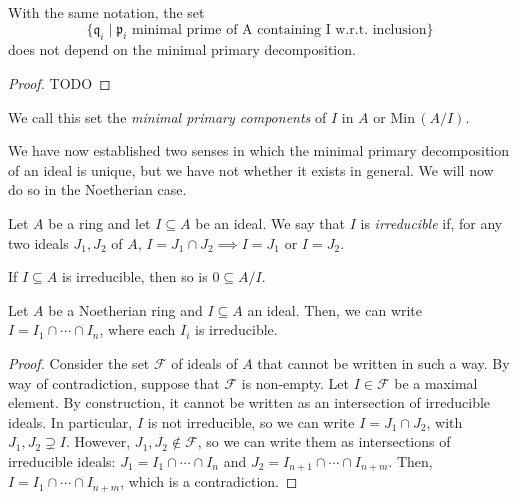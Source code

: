 \begin{theorem}
    With the same notation, the set \[\{\mathfrak{q}_i \mid \mathfrak{p}_i \text{ minimal prime of A containing I w.r.t. inclusion}\}\]
    does not depend on the minimal primary decomposition.

    \begin{proof}
        TODO %
    \end{proof}
\end{theorem}

\begin{defn}
    We call this set the \emph{minimal primary components} of $I$ in $A$ or $\text{Min}\,(A/I)$.
\end{defn}

\begin{rk}
    We have now established two senses in which the minimal primary
    decomposition of an ideal is unique,
    but we have not whether it exists in general.
    We will now do so in the Noetherian case.
\end{rk}

\begin{defn}
    Let $A$ be a ring and let $I\subseteq A$ be an ideal.
    We say that $I$ is \emph{irreducible} if,
    for any two ideals $J_1, J_2$ of $A$,
    $I = J_1 \cap J_2 \implies I = J_1 \text{ or } I = J_2$.
\end{defn}

\begin{rk}
    If $I \subseteq A$ is irreducible, then so is $0 \subseteq A / I$. 
\end{rk}

\begin{prop}
    Let $A$ be a Noetherian ring and $I \subseteq A$ an ideal.
    Then, we can write $I = I_1 \cap \cdots \cap I_n$,
    where each $I_i$ is irreducible.

    \begin{proof}
        Consider the set $\mathcal{F}$ of ideals of $A$ that cannot be written in such a way.
        By way of contradiction, suppose that $\mathcal{F}$ is non-empty.
        Let $I \in \mathcal{F}$ be a maximal element.
        By construction, it cannot be written as an intersection of irreducible ideals.
        In particular, $I$ is not irreducible, so we can write $I = J_1 \cap J_2$,
        with $J_1, J_2 \supsetneq I$.
        However, $J_1, J_2 \notin \mathcal{F}$, so we can write
        them as intersections of irreducible ideals:
        $J_1 = I_1 \cap \cdots \cap I_n$
        and
        $J_2 = I_{n+1} \cap \cdots \cap I_{n+m}$.
        Then, $I = I_1 \cap \cdots \cap I_{n+m}$,
        which is a contradiction.

    \end{proof}
\end{prop}

